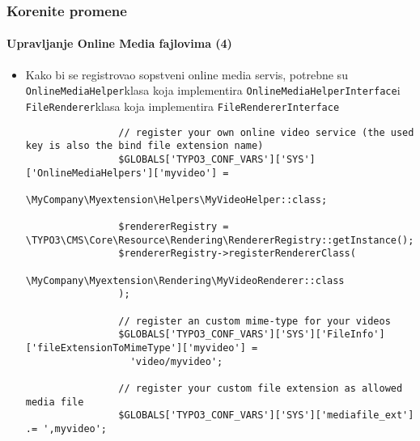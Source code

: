 \begin{frame}[fragile]
	\frametitle{Korenite promene}
	\framesubtitle{Upravljanje Online Media fajlovima (4)}

	\lstset{basicstyle=\tiny\ttfamily}

	\begin{itemize}

		\item Kako bi se registrovao sopstveni online media servis, potrebne su
			\small\texttt{OnlineMediaHelper}\normalsize\space klasa koja implementira
			\small\texttt{OnlineMediaHelperInterface}\normalsize\space i
			\small\texttt{FileRenderer}\normalsize\space klasa koja implementira
			\small\texttt{FileRendererInterface}\normalsize\space

			\begin{lstlisting}
				// register your own online video service (the used key is also the bind file extension name)
				$GLOBALS['TYPO3_CONF_VARS']['SYS']['OnlineMediaHelpers']['myvideo'] =
				  \MyCompany\Myextension\Helpers\MyVideoHelper::class;

				$rendererRegistry = \TYPO3\CMS\Core\Resource\Rendering\RendererRegistry::getInstance();
				$rendererRegistry->registerRendererClass(
				  \MyCompany\Myextension\Rendering\MyVideoRenderer::class
				);

				// register an custom mime-type for your videos
				$GLOBALS['TYPO3_CONF_VARS']['SYS']['FileInfo']['fileExtensionToMimeType']['myvideo'] =
				  'video/myvideo';

				// register your custom file extension as allowed media file
				$GLOBALS['TYPO3_CONF_VARS']['SYS']['mediafile_ext'] .= ',myvideo';
			\end{lstlisting}

	\end{itemize}

\end{frame}


